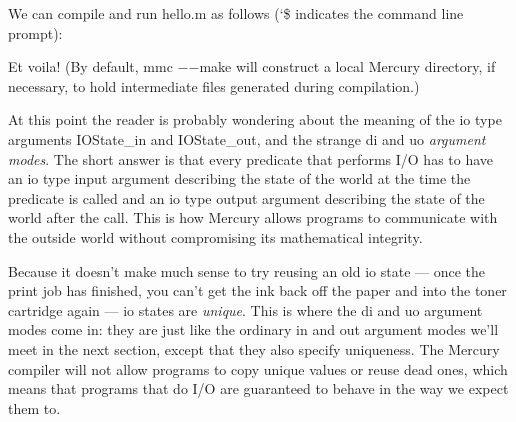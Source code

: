 \documentclass[a4paper,11pt,notitlepage,onecolumn]{book}
\begin{document}
We can compile and run \textsf{hello.m} as follows (\textsf{\char`\${}} indicates the command line
prompt):
\begin{small}

\begin{ptabular}
\nextline
{}
\nextline
{}
\nextline
{}
\nextline
{}
\nextline
{}
\nextline
{}
\nextline
\end{ptabular}

\end{small}
Et voila!  (By default, \textsf{mmc {\ensuremath{-}}{\ensuremath{-}}make} will construct a local \textsf{Mercury}
directory, if necessary, to hold intermediate files generated during
compilation.)

At this point the reader is probably wondering about the meaning of the \textsf{io}
type arguments \textsf{IOState\_in} and \textsf{IOState\_out}, and the strange \textsf{di} and \textsf{uo}
\emph{argument modes}.  The short answer is that every predicate that
performs I/O has to have an \textsf{io} type input argument describing
the state of the world at the time the predicate is called and an \textsf{io} type
output argument describing the state of the world after the call.  This is
how Mercury allows programs to communicate with the outside world without
compromising its mathematical integrity.

Because it doesn't make much sense to try reusing an old \textsf{io} state --- once
the print job has finished, you can't get the ink back off the
paper and into the toner cartridge again --- \textsf{io} states are \emph{unique}.
This is where the \textsf{di} and \textsf{uo} argument modes come in: they are just like
the ordinary \textsf{in} and \textsf{out} argument modes we'll meet in the next section,
except that they also specify uniqueness.  The Mercury compiler will not
allow programs to copy unique values or reuse dead ones, which means that
programs that do I/O are guaranteed to behave in the way we expect them to.
\end{document}
